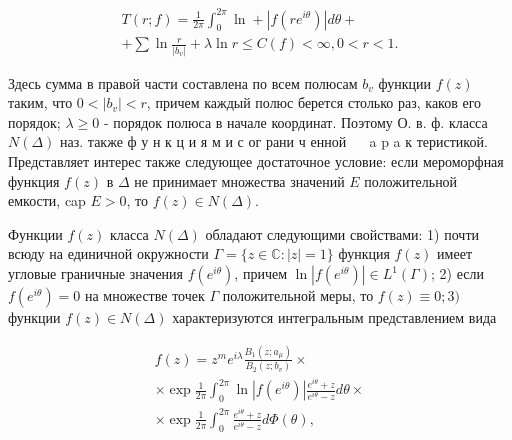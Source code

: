 \documentclass[10pt]{article}
\begin{document}
\[

\begin{gathered}

T(r ; f)=\frac{1}{2 \pi} \int_{0}^{2 \pi} \ln +\left|f\left(r e^{i \theta}\right)\right| d \theta+ \\

+\sum \ln \frac{r}{\left|b_{v}\right|}+\lambda \ln r \leqslant C(f)<\infty, 0<r<1 .

\end{gathered}

\]



Здесь сумма в правой части составлена по всем полюсам $b_{v}$ функции $f(z)$ таким, что $0<\left|b_{v}\right|<r$, причем каждый полюс берется столько раз, каков его порядок; $\lambda \geqslant 0$ - порядок полюса в начале координат. Поэтому О. в. ф. класса $N(\Delta)$ наз. также ф у н к ц и я м и с ог рани ч енной $\quad$ a p a к теристикой. Представляет интерес также следующее достаточное условие: если мероморфная функция $f(z)$ в $\Delta$ не принимает множества значений $E$ положительной емкости, cap $E>0$, то $f(z) \in N(\Delta)$.



Функции $f(z)$ класса $N(\Delta)$ обладают следующими свойствами: 1) почти всюду на единичной окружности $\Gamma=\{z \in \mathbb{C}:|z|=1\}$ функция $f(z)$ имеет угловые граничные значения $f\left(e^{i \theta}\right)$, причем $\ln \left|f\left(e^{i \theta}\right)\right| \in L^{1}(\Gamma)$; 2) если $f\left(e^{i \theta}\right)=0$ на множестве точек $\Gamma$ положительной меры, то $f(z) \equiv 0 ; 3)$ функции $f(z) \in N(\Delta)$ характеризуются интегральным представлением вида



\[

\begin{gathered}

f(z)=z^{m} e^{i \lambda} \frac{B_{1}\left(z ; a_{\mu}\right)}{B_{2}\left(z ; b_{v}\right)} \times \\

\times \exp \frac{1}{2 \pi} \int_{0}^{2 \pi} \ln \left|f\left(e^{i \theta}\right)\right| \frac{e^{i \theta}+z}{e^{i \theta}-z} d \theta \times \\

\times \exp \frac{1}{2 \pi} \int_{0}^{2 \pi} \frac{e^{i \theta}+z}{e^{i \theta}-z} d \Phi(\theta),

\end{gathered}

\]
\end{document}
